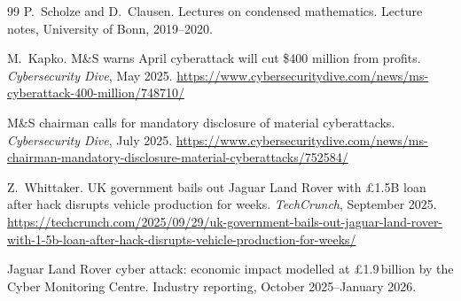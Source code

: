 \documentclass[11pt]{article}
\begin{document}
\begin{thebibliography}{99}
 P.~Scholze and D.~Clausen. Lectures on condensed mathematics. Lecture notes, University of Bonn, 2019--2020.

 M.~Kapko. M\&S warns April cyberattack will cut \$400 million from profits. \emph{Cybersecurity Dive}, May 2025. \url{https://www.cybersecuritydive.com/news/ms-cyberattack-400-million/748710/}

 M\&S chairman calls for mandatory disclosure of material cyberattacks. \emph{Cybersecurity Dive}, July 2025. \url{https://www.cybersecuritydive.com/news/ms-chairman-mandatory-disclosure-material-cyberattacks/752584/}

 Z.~Whittaker. UK government bails out Jaguar Land Rover with \pounds1.5B loan after hack disrupts vehicle production for weeks. \emph{TechCrunch}, September 2025. \url{https://techcrunch.com/2025/09/29/uk-government-bails-out-jaguar-land-rover-with-1-5b-loan-after-hack-disrupts-vehicle-production-for-weeks/}

 Jaguar Land Rover cyber attack: economic impact modelled at \pounds1.9\,billion by the Cyber Monitoring Centre. Industry reporting, October 2025--January 2026.

\end{thebibliography}
\end{document}
